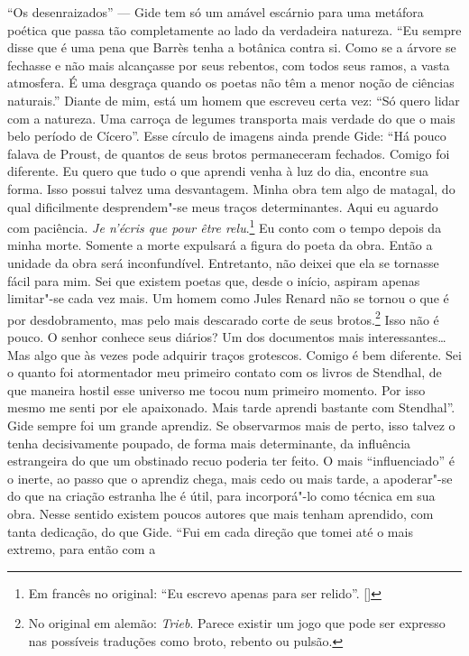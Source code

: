 ``Os desenraizados'' --- Gide tem só um amável escárnio para uma metáfora
poética que passa tão completamente ao lado da verdadeira natureza. ``Eu
sempre disse que é uma pena que Barrès tenha a botânica contra si. Como
se a árvore se fechasse e não mais alcançasse por seus rebentos, com
todos seus ramos, a vasta atmosfera. É uma desgraça quando os poetas não
têm a menor noção de ciências naturais.'' Diante de mim, está um homem
que escreveu certa vez: ``Só quero lidar com a natureza. Uma carroça
de legumes transporta mais verdade do que o mais belo período de
Cícero''. Esse círculo de imagens ainda prende Gide: ``Há pouco falava
de Proust, de quantos de seus brotos permaneceram fechados. Comigo foi
diferente. Eu quero que tudo o que aprendi venha à luz do dia, encontre
sua forma. Isso possui talvez uma desvantagem. Minha obra tem algo de
matagal, do qual dificilmente desprendem"-se meus traços determinantes.
Aqui eu aguardo com paciência. \emph{Je n'écris que pour être
relu}.\footnote{Em francês no original: ``Eu escrevo apenas para
  ser relido''. []} Eu conto com o tempo depois da minha morte. Somente
a morte expulsará a figura do poeta da obra. Então a unidade da obra
será inconfundível. Entretanto, não deixei que ela se tornasse fácil
para mim. Sei que existem poetas que, desde o início, aspiram apenas
limitar"-se cada vez mais. Um homem como Jules Renard não se tornou o que
é por desdobramento, mas pelo mais descarado corte de seus
brotos.\footnote{No original em alemão: \emph{Trieb}. Parece existir um jogo
  que pode ser expresso nas possíveis traduções como broto, rebento ou
  pulsão. \versal{[N.~T.]}} Isso não é pouco. O senhor conhece seus diários? Um dos
documentos mais interessantes\ldots{} Mas algo que às vezes pode adquirir
traços grotescos. Comigo é bem diferente. Sei o quanto foi
atormentador meu primeiro contato com os livros de Stendhal, de que maneira
hostil esse universo me tocou num primeiro momento. Por isso mesmo me
senti por ele apaixonado. Mais tarde aprendi bastante com Stendhal''.
Gide sempre foi um grande aprendiz. Se observarmos mais de perto, isso
talvez o tenha decisivamente poupado, de forma mais determinante, da
influência estrangeira do que um obstinado recuo poderia ter feito. O
mais ``influenciado'' é o inerte, ao passo que o aprendiz chega, mais
cedo ou mais tarde, a apoderar"-se do que na criação estranha lhe é útil,
para incorporá"-lo como técnica em sua obra. Nesse sentido existem poucos
autores que mais tenham aprendido, com tanta dedicação, do que Gide.
``Fui em cada direção que tomei até o mais extremo, para então com a
